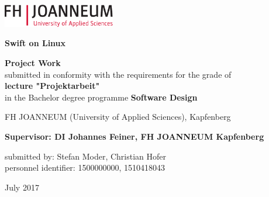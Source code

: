 \chapterend

\begin{titlepage}

\begin{center}
\includegraphics[height=1cm]{images/logo_FHJ_100mm_cmyk}
\hfill

\mbox{}\vfill

  \large

  {\huge\bf Swift on Linux}

  \vspace{2.0cm}

  {\bf Project Work}\\
submitted in conformity with the requirements for the grade of\\
{\bf lecture "Projektarbeit"}\\
in the Bachelor degree programme {\bf Software Design\\}

  \vspace{0.5cm}

 FH JOANNEUM  (University of Applied Sciences), Kapfenberg

  \vspace{1.5cm}

  \mbox{}

  {\bf Supervisor: DI Johannes Feiner, FH JOANNEUM Kapfenberg

  submitted by: Stefan Moder, Christian Hofer\\
  personnel identifier: 1500000000, 1510418043}

  \vspace{1.5cm}

   July 2017

\end{center}
\vfill\mbox{}


\end{titlepage}



\chapterend

